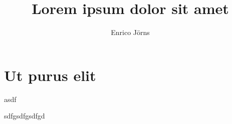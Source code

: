 \documentclass[a4paper,11pt,bcor=10mm,marginright]{tubsartcl}
\title{Lorem ipsum dolor sit amet}
\author{Enrico Jörns}
\begin{document}
\maketitle[image]



\tableofcontents

\twocolumn


\section{Ut purus elit}

\begin{gaussbox}[frame=fbox]{3}{1}{3}{3}
asdf
\end{gaussbox}

\lipsum[1]
\begin{gaussbox}[frame=fbox]{1}{1}{2}{3}
sdfgsdfgsdfgd
\end{gaussbox}
\end{document}
